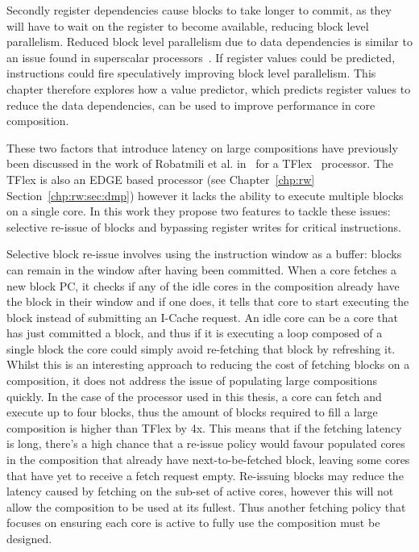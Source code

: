 Secondly register dependencies cause blocks to take longer to commit, as they will have to wait on the register to become available, reducing block level parallelism.
Reduced block level parallelism due to data dependencies is similar to an issue found in superscalar processors~\cite{peraisBeBop2015}.
If register values could be predicted, instructions could fire speculatively improving block level parallelism.
This chapter therefore explores how a value predictor, which predicts register values to reduce the data dependencies, can be used to improve performance in core composition.

These two factors that introduce latency on large compositions have previously been discussed in the work of Robatmili et al. in~\cite{robatmili2011uniproc} for a TFlex~\cite{kim2007tflex} processor.
The TFlex is also an EDGE based processor (see Chapter~\ref{chp:rw} Section~\ref{chp:rw:sec:dmp}) however it lacks the ability to execute multiple blocks on a single core.
In this work they propose two features to tackle these issues: selective re-issue of blocks and bypassing register writes for critical instructions.

Selective block re-issue involves using the instruction window as a buffer: blocks can remain in the window after having been committed.
When a core fetches a new block PC, it checks if any of the idle cores in the composition already have the block in their window and if one does, it tells that core to start executing the block instead of submitting an I-Cache request.
An idle core can be a core that has just committed a block, and thus if it is executing a loop composed of a single block the core could simply avoid re-fetching that block by refreshing it.
Whilst this is an interesting approach to reducing the cost of fetching blocks on a composition, it does not address the issue of populating large compositions quickly.
In the case of the processor used in this thesis, a core can fetch and execute up to four blocks, thus the amount of blocks required to fill a large composition is higher than TFlex by 4x.
This means that if the fetching latency is long, there's a high chance that a re-issue policy would favour populated cores in the composition that already have next-to-be-fetched block, leaving some cores that have yet to receive a fetch request empty.
Re-issuing blocks may reduce the latency caused by fetching on the sub-set of active cores, however this will not allow the composition to be used at its fullest.
Thus another fetching policy that focuses on ensuring each core is active to fully use the composition must be designed.

